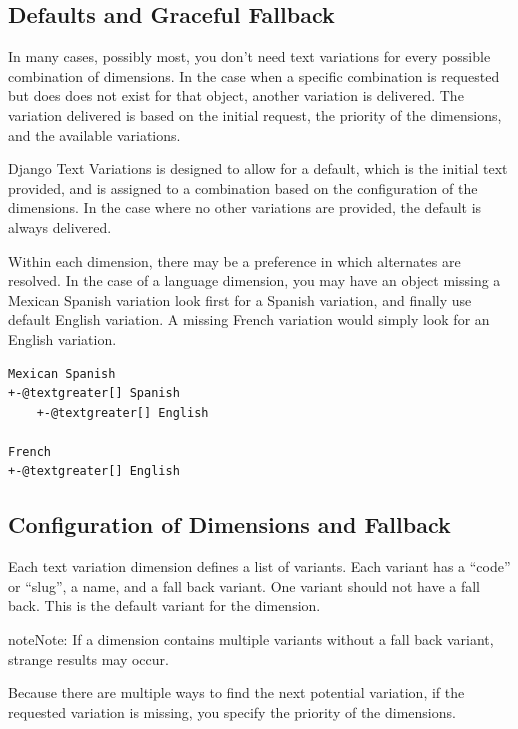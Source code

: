 \documentclass[letterpaper,10pt,english]{sphinxmanual}
\begin{document}
\subsection{Defaults and Graceful Fallback}
\label{getting_started:defaults-and-graceful-fallback}
In many cases, possibly most, you don't need text variations for every possible combination of dimensions. In the case when a specific combination is requested but does does not exist for that object, another variation is delivered. The variation delivered is based on the initial request, the priority of the dimensions, and the available variations.

Django Text Variations is designed to allow for a default, which is the initial text provided, and is assigned to a combination based on the configuration of the dimensions. In the case where no other variations are provided, the default is always delivered.

Within each dimension, there may be a preference in which alternates are resolved. In the case of a language dimension, you may have an object missing a Mexican Spanish variation look first for a Spanish variation, and finally use default English variation. A missing French variation would simply look for an English variation.

\begin{Verbatim}[commandchars=@\[\]]
Mexican Spanish
+-@textgreater[] Spanish
    +-@textgreater[] English

French
+-@textgreater[] English
\end{Verbatim}


\subsection{Configuration of Dimensions and Fallback}
\label{getting_started:configuration-of-dimensions-and-fallback}
Each text variation dimension defines a list of variants. Each variant has a ``code'' or ``slug'', a name, and a fall back variant. One variant should not have a fall back. This is the default variant for the dimension.

\begin{notice}{note}{Note:}
If a dimension contains multiple variants without a fall back variant, strange results may occur.
\end{notice}

Because there are multiple ways to find the next potential variation, if the requested variation is missing, you specify the priority of the dimensions.
\end{document}
